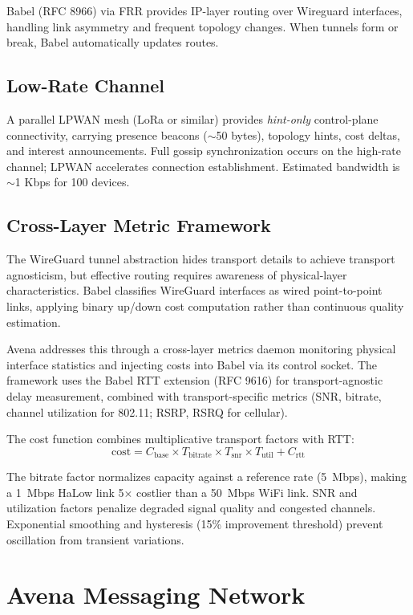 \documentclass[journal]{IEEEtran}
\begin{document}
Babel (RFC 8966) via FRR provides IP-layer routing over Wireguard interfaces, handling link asymmetry and frequent topology changes. When tunnels form or break, Babel automatically updates routes.

\subsection{Low-Rate Channel}

A parallel LPWAN mesh (LoRa or similar) provides \emph{hint-only} control-plane connectivity, carrying presence beacons ($\sim$50 bytes), topology hints, cost deltas, and interest announcements. Full gossip synchronization occurs on the high-rate channel; LPWAN accelerates connection establishment. Estimated bandwidth is $\sim$1 Kbps for 100 devices.

\subsection{Cross-Layer Metric Framework}

The WireGuard tunnel abstraction hides transport details to achieve transport agnosticism, but effective routing requires awareness of physical-layer characteristics. Babel classifies WireGuard interfaces as wired point-to-point links, applying binary up/down cost computation rather than continuous quality estimation.

Avena addresses this through a cross-layer metrics daemon monitoring physical interface statistics and injecting costs into Babel via its control socket. The framework uses the Babel RTT extension (RFC 9616) for transport-agnostic delay measurement, combined with transport-specific metrics (SNR, bitrate, channel utilization for 802.11; RSRP, RSRQ for cellular).

The cost function combines multiplicative transport factors with RTT:
\begin{equation}
\text{cost} = C_{\text{base}} \times T_{\text{bitrate}} \times T_{\text{snr}} \times T_{\text{util}} + C_{\text{rtt}}
\end{equation}

The bitrate factor normalizes capacity against a reference rate (5~Mbps), making a 1~Mbps HaLow link 5$\times$ costlier than a 50~Mbps WiFi link. SNR and utilization factors penalize degraded signal quality and congested channels. Exponential smoothing and hysteresis (15\% improvement threshold) prevent oscillation from transient variations.


\section{Avena Messaging Network}
\label{sec:messaging}
\end{document}
